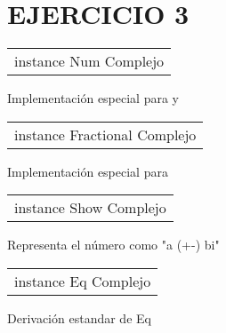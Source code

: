 \section{EJERCICIO 3}
\begin{haddockdesc}
\item[\begin{tabular}{@{}l}
instance Num Complejo
\end{tabular}]
{\haddockbegindoc
Implementación especial para \haddockid{(+)} \haddockid{(-)} y \haddockid{(*)}\par}
\end{haddockdesc}
\begin{haddockdesc}
\item[\begin{tabular}{@{}l}
instance Fractional Complejo
\end{tabular}]
{\haddockbegindoc
Implementación especial para \haddockid{(/)}\par}
\end{haddockdesc}
\begin{haddockdesc}
\item[\begin{tabular}{@{}l}
instance Show Complejo
\end{tabular}]
{\haddockbegindoc
Representa el número como "a (+-) bi"\par}
\end{haddockdesc}
\begin{haddockdesc}
\item[\begin{tabular}{@{}l}
instance Eq Complejo
\end{tabular}]
{\haddockbegindoc
Derivación estandar de Eq\par}
\end{haddockdesc}
